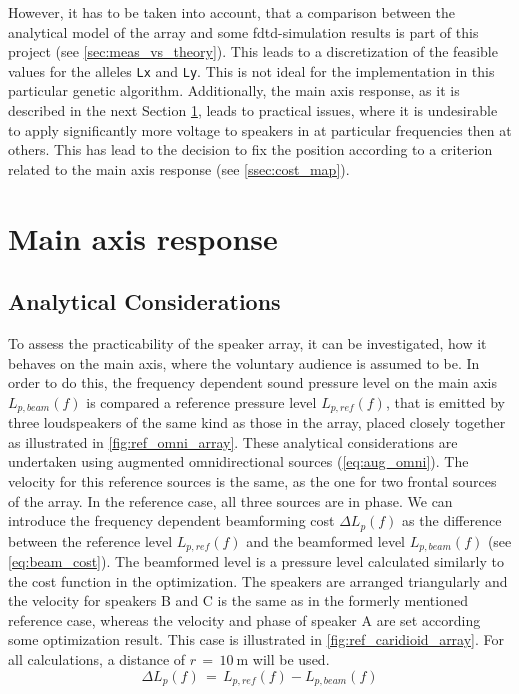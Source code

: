 However, it has to be taken into account, that a comparison between the analytical model of the array and some \gls{fdtd}-simulation results is part of this project (see \autoref{sec:meas_vs_theory}). This leads to a discretization of the feasible values for the alleles \textcolor{green3}{\texttt{Lx}} and \textcolor{green3}{\texttt{Ly}}. This is not ideal for the implementation in this particular genetic algorithm. Additionally, the main axis response, as it is described in the next Section \ref{sec:main_axis}, leads to practical issues, where it is undesirable to apply significantly more voltage to speakers in at particular frequencies then at others. This has lead to the decision to fix the position according to a criterion related to the main axis response (see \autoref{ssec:cost_map}).


\section{Main axis response}\label{sec:main_axis}
\subsection{Analytical Considerations}\label{ssec:main_axis_formulas}
To assess the practicability of the speaker array, it can be investigated, how it behaves on the main axis, where the voluntary audience is assumed to be. In order to do this, the frequency dependent sound pressure level on the main axis $L_{p,beam}(f)$ is compared a reference pressure level $L_{p,ref}(f)$, that is emitted by three loudspeakers of the same kind as those in the array, placed closely together as illustrated in \autoref{fig:ref_omni_array}. These analytical considerations are undertaken using augmented omnidirectional sources (\autoref{eq:aug_omni}). The velocity for this reference sources is the same, as the one for two frontal sources of the array. In the reference case, all three sources are in phase.
We can introduce the frequency dependent beamforming cost $\Delta L_{p}(f)$ as the difference between the reference level $L_{p,ref}(f)$ and the beamformed level $L_{p,beam}(f)$ (see \autoref{eq:beam_cost}).  The beamformed level is a pressure level calculated similarly to the cost function in the optimization. The speakers are arranged triangularly and the velocity for speakers B and C is the same as in the formerly mentioned reference case, whereas the velocity and phase of speaker A are set according some optimization result. This case is illustrated in \autoref{fig:ref_caridioid_array}. For all calculations, a distance of $r\,=\,\SI{10}{\meter}$ will be used.
\begin{equation}\label{eq:beam_cost}
\Delta L_{p}(f)\,=\,L_{p,ref}(f)-L_{p,beam}(f)
\end{equation}

